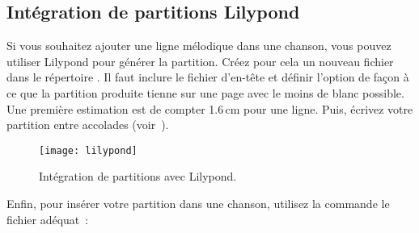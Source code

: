 \subsection{Intégration de partitions Lilypond}

Si vous souhaitez ajouter une ligne mélodique dans une chanson, vous
pouvez utiliser Lilypond pour générer la partition. Créez pour cela
un nouveau fichier  dans le répertoire
. Il faut inclure le fichier d'en-tête
 et définir l'option  de façon à ce que la
partition produite tienne sur une page avec le moins de blanc
possible. Une première estimation est de compter 1.6\,cm pour une
ligne. Puis, écrivez votre partition entre accolades
(voir~).

\begin{figure}
  \begin{minipage}[b]{\linewidth}
    \centering
    \texttt{[image: lilypond]}
    \vspace{0.5cm}
  \end{minipage}

  \begin{minipage}[b]{\linewidth}
  \end{minipage}
  \caption{Intégration de partitions avec Lilypond.}
  \label{fig:lilypond}
\end{figure}

Enfin, pour insérer votre partition  dans une
chanson, utilisez la commande  le fichier
 adéquat~:

\begin{songbook}
\end{songbook}


